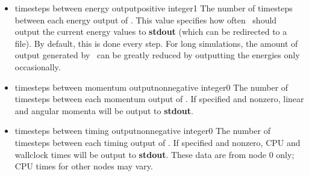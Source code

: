 \begin{itemize}
\item
{}
{timesteps between energy output}{positive integer}{1}
{
The number of timesteps between each energy output of \NAMD.  
This value
specifies how often \NAMD\ should output the current energy 
values to {\bf stdout} (which can be redirected to a file).  
By default, this is done every step.  
For long simulations, 
the amount of output generated by \NAMD\ can be greatly reduced 
by outputting the energies only occasionally.  
}

\item
{}
{timesteps between momentum output}{nonnegative integer}{0}
{
The number of timesteps between each momentum output of \NAMD.
If specified and nonzero, linear and angular momenta will be
output to {\bf stdout}.
}

\item
{}
{timesteps between timing output}{nonnegative integer}{0}
{
The number of timesteps between each timing output of \NAMD.
If specified and nonzero, CPU and wallclock times will be
output to {\bf stdout}.
These data are from node 0 only; CPU times for other nodes
may vary.
}

\end{itemize}

